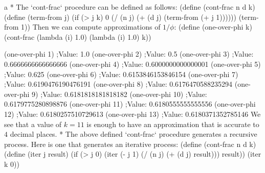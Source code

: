 \begitems\style a
* The `cont-frac` procedure can be defined as follows:
\begtt\scm
(define (cont-frac n d k)
  (define (term-from j)
    (if (> j k)
        0
        (/ (n j)
           (+ (d j) (term-from (+ j 1))))))
  (term-from 1))
\endtt
Then we can compute approximations of $1/\phi$:
\begtt\scm
(define (one-over-phi k)
  (cont-frac (lambda (i) 1.0)
             (lambda (i) 1.0)
             k))

(one-over-phi 1)
;Value: 1.0
(one-over-phi 2)
;Value: 0.5
(one-over-phi 3)
;Value: 0.6666666666666666
(one-over-phi 4)
;Value: 0.6000000000000001
(one-over-phi 5)
;Value: 0.625
(one-over-phi 6)
;Value: 0.6153846153846154
(one-over-phi 7)
;Value: 0.6190476190476191
(one-over-phi 8)
;Value: 0.6176470588235294
(one-over-phi 9)
;Value: 0.6181818181818182
(one-over-phi 10)
;Value: 0.6179775280898876
(one-over-phi 11)
;Value: 0.6180555555555556
(one-over-phi 12)
;Value: 0.6180257510729613
(one-over-phi 13)
;Value: 0.6180371352785146
\endtt
We see that a value of $k=11$ is enough to have an approximation that is accurate to $4$ decimal places.
* The above defined `cont-frac` procedure generates a recursive process.  Here is one that generates an iterative process:
\begtt\scm
(define (cont-frac n d k)
  (define (iter j result)
    (if (> j 0)
        (iter (- j 1)
              (/ (n j)
                 (+ (d j) result)))
        result))
  (iter k 0))
\endtt
\enditems
